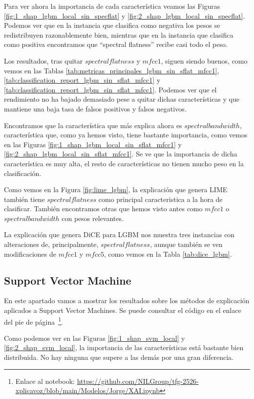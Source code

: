 Para ver ahora la importancia de cada característica veamos las Figuras \ref{fig:1_shap_lgbm_local_sin_specflat} y \ref{fig:2_shap_lgbm_local_sin_specflat}. Podemos ver que en la instancia que clasifica como negativa los pesos se redistribuyen razonablemente bien, mientras que en la instancia que clasifica como positiva encontramos que ``spectral flatness'' recibe casi todo el peso.

Los resultados, tras quitar $spectral flatness$ y $mfcc 1$, siguen siendo buenos, como vemos en las Tablas \ref{tab:metricas_principales_lgbm_sin_sflat_mfcc1}, \ref{tab:classification_report_lgbm_sin_sflat_mfcc1} y \ref{tab:classification_report_lgbm_sin_sflat_mfcc1}. Podemos ver que el rendimiento no ha bajado demasiado pese a quitar dichas características y que mantiene una baja tasa de falsos positivos y falsos negativos.

Encontramos que la característica que más explica ahora es $spectral bandwidth$, característica que, como ya hemos visto, tiene bastante importancia, como vemos en las Figuras \ref{fig:1_shap_lgbm_local_sin_sflat_mfcc1} y \ref{fig:2_shap_lgbm_local_sin_sflat_mfcc1}. Se ve que la importancia de dicha característica es muy alta, el resto de características no tienen mucho peso en la clasificación.

Como vemos en la Figura \ref{fig:lime_lgbm}, la explicación que genera LIME también tiene $spectral flatness$ como principal caracteristica a la hora de clasificar. También encontramos otras que hemos visto antes como $mfcc 1$ o $spectral bandwidth$ con pesos relevantes.

La explicación que genera DiCE para LGBM nos muestra tres instancias con alteraciones de, principalmente, $spectral flatness$, aunque también se ven modificaciones de $mfcc 1$ y $mfcc 5$, como vemos en la Tabla \ref{tab:dice_lgbm}.

\subsection{Support Vector Machine}
\label{res_xai_svm}

En este apartado vamos a mostrar los resultados sobre los métodos de explicación aplicados a Support Vector Machines. Se puede consultar el código en el enlace del pie de página~\footnote{Enlace al notebook: \url{https://github.com/NILGroup/tfg-2526-xplicavoz/blob/main/Modelos/Jorge/XAI.ipynb}}.

Como podemos ver en las Figuras \ref{fig:1_shap_svm_local} y \ref{fig:2_shap_svm_local}, la importancia de las características está bastante bien distribuida. No hay ninguna que supere a las demás por una gran diferencia.

